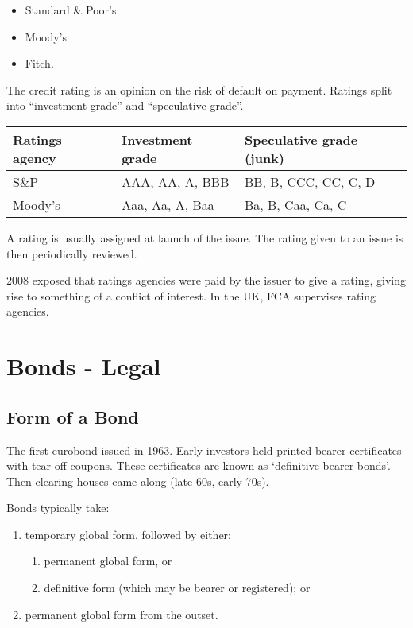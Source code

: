 \documentclass[
]{article}
\providecommand{\tightlist}{%
  \setlength{\itemsep}{0pt}\setlength{\parskip}{0pt}}
\begin{document}
\begin{itemize}
\tightlist
\item
  Standard \& Poor's
\item
  Moody's
\item
  Fitch.
\end{itemize}

The credit rating is an opinion on the risk of default on payment.
Ratings split into ``investment grade'' and ``speculative grade''.

\begin{longtable}[]{@{}lll@{}}
\toprule()
Ratings agency & Investment grade & Speculative grade (junk) \\
\midrule()
\endhead
S\&P & AAA, AA, A, BBB & BB, B, CCC, CC, C, D \\
Moody's & Aaa, Aa, A, Baa & Ba, B, Caa, Ca, C \\
\bottomrule()
\end{longtable}

A rating is usually assigned at launch of the issue. The rating given to
an issue is then periodically reviewed.

2008 exposed that ratings agencies were paid by the issuer to give a
rating, giving rise to something of a conflict of interest. In the UK,
FCA supervises rating agencies.

\hypertarget{bonds---legal}{%
\section{Bonds - Legal}\label{bonds---legal}}

\hypertarget{form-of-a-bond}{%
\subsection{Form of a Bond}\label{form-of-a-bond}}

The first eurobond issued in 1963. Early investors held printed bearer
certificates with tear-off coupons. These certificates are known as
`definitive bearer bonds'. Then clearing houses came along (late 60s,
early 70s).

Bonds typically take:

\begin{enumerate}
\tightlist
\item
  temporary global form, followed by either:

  \begin{enumerate}
  \tightlist
  \item
    permanent global form, or
  \item
    definitive form (which may be bearer or registered); or
  \end{enumerate}
\item
  permanent global form from the outset.
\end{enumerate}
\end{document}
